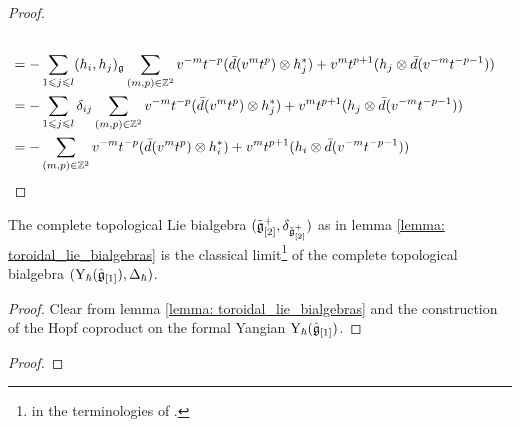 \begin{proof}
$$\begin{aligned}
                                \\
                                & = -\sum_{1 \leq j \leq l} (h_i, h_j)_{\g} \sum_{(m, p) \in \Z^2} v^{-m} t^{-p} ( \bar{d}(v^m t^p) \tensor h_j^* ) + v^m t^{p + 1} ( h_j \tensor \bar{d}(v^{-m} t^{-p - 1}) )
                                \\
                                & = -\sum_{1 \leq j \leq l} \delta_{ij} \sum_{(m, p) \in \Z^2} v^{-m} t^{-p} ( \bar{d}(v^m t^p) \tensor h_j^* ) + v^m t^{p + 1} ( h_j \tensor \bar{d}(v^{-m} t^{-p - 1}) )
                                \\
                                & = -\sum_{(m, p) \in \Z^2} v^{-m} t^{-p} ( \bar{d}(v^m t^p) \tensor h_i^* ) + v^m t^{p + 1} ( h_i \tensor \bar{d}(v^{-m} t^{-p - 1}) )
                            \end{aligned}
                        $$
                \end{proof}
            \begin{theorem} \label{theorem: toroidal_lie_algebras_as_classical_limits_of_affine_yangians}
                The complete topological Lie bialgebra $(\tilde{\mathfrak{g}}_{[2]}^+, \delta_{\tilde{\mathfrak{g}}_{[2]}^+})$ as in lemma \ref{lemma: toroidal_lie_bialgebras} is the classical limit\footnote{ in the terminologies of \cite{etingof_kazhdan_quantisation_1}.} of the complete topological bialgebra $(\mathrm{Y}_{\hbar}(\hat{\mathfrak{g}}_{[1]}), \Delta_{\hbar})$.
            \end{theorem}
                \begin{proof}
                    Clear from lemma \ref{lemma: toroidal_lie_bialgebras} and the construction of the Hopf coproduct on the formal Yangian $\mathrm{Y}_{\hbar}(\hat{\mathfrak{g}}_{[1]})$. 
                \end{proof}
                
            \begin{definition} \label{def: parametrised_pseudo_quantisations}
                
            \end{definition}
            \begin{theorem} \label{theorem: parametrised_pseudo_classical_limits_of_affine_yangians}
                
            \end{theorem}
                \begin{proof}
                    
                \end{proof}

    \begin{appendices}
        
    
        
    \end{appendices}
            
    \printbibliography

